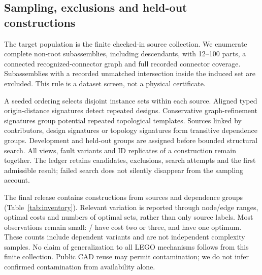 \documentclass[10pt,twocolumn,letterpaper]{article}
\begin{document}
\subsection{Sampling, exclusions and held-out constructions}
The target population is the finite checked-in source collection.
We enumerate complete non-root subassemblies, including descendants,
with 12--100 parts, a connected recognized-connector graph and full
recorded connector coverage. Subassemblies with a recorded unmatched
intersection inside the induced set are excluded.
This rule is a dataset screen, not a physical certificate.

A seeded ordering selects disjoint instance sets within each source.
Aligned typed origin-distance signatures detect repeated designs.
Conservative graph-refinement signatures group potential repeated
topological templates. Sources linked by contributors, design
signatures or topology signatures form transitive dependence groups.
Development and held-out groups are assigned before bounded
structural search. All views, fault variants and ID replicates of
a construction remain together. The ledger retains candidates,
exclusions, search attempts and the first admissible result; failed
search does not silently disappear from the sampling account.

\begin{table}[t]
\centering\small
\caption{Generated inventory for the primary version. Additional
views are observations, not additional construction groups.}
\label{tab:inventory}

\end{table}

The final release contains \VRConstructions{} constructions from
\VRSources{} sources and \VRGroups{} dependence groups
(Table~\ref{tab:inventory}).
Relevant variation is reported through node/edge ranges, optimal
costs and numbers of optimal sets, rather than only source labels.
Most observations remain small: \VRLowCost{}/\VRObservations{}
have cost two or three, and \VRSingleOptimum{} have one optimum.
These counts include dependent variants and are not independent
complexity samples.
No claim of generalization to all LEGO mechanisms follows from
this finite collection. Public CAD reuse may permit contamination;
we do not infer confirmed contamination from availability alone.
\end{document}
